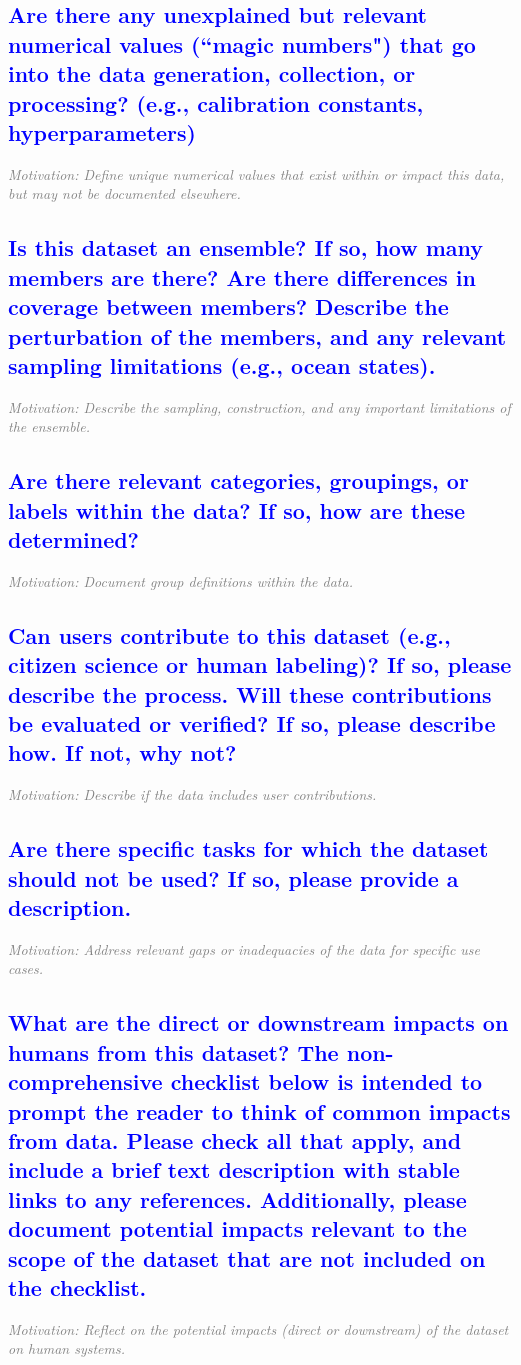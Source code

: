\documentclass[letterpaper, 10 pt, transmag]{IEEEtran}
\begin{document}
\textcolor{blue}{\subsection{Are there any unexplained but relevant numerical values (``magic numbers") that go into the data generation, collection, or processing? (e.g., calibration constants, hyperparameters)}}
\textcolor{gray}{\textit{Motivation: Define unique numerical values that exist within or impact this data, but may not be documented elsewhere.}}

\textcolor{blue}{\subsection{Is this dataset an ensemble? If so, how many members are there? Are there differences in coverage between members? Describe the perturbation of the members, and any relevant sampling limitations (e.g., ocean states).}}
\textcolor{gray}{\textit{Motivation: Describe the sampling, construction, and any important limitations of the ensemble.}}

\textcolor{blue}{\subsection{Are there relevant categories, groupings, or labels within the data? If so, how are these determined?}}
\textcolor{gray}{\textit{Motivation: Document group definitions within the data.}}

\textcolor{blue}{\subsection{Can users contribute to this dataset (e.g., citizen science or human labeling)? If so, please describe the process. Will these contributions be evaluated or verified? If so, please describe how. If not, why not?}}
\textcolor{gray}{\textit{Motivation: Describe if the data includes user contributions.}}

\textcolor{blue}{\subsection{Are there specific tasks for which the dataset should not be used? If so,
please provide a description.}}
\textcolor{gray}{\textit{Motivation: Address relevant gaps or inadequacies of the data for specific use cases.}}

\textcolor{blue}{\subsection{What are the direct or downstream impacts on humans from this dataset? The non-comprehensive checklist below is intended to prompt the reader to think of common impacts from data. Please check all that apply, and include a brief text description with stable links to any references. Additionally, please document potential impacts relevant to the scope of the dataset that are not included on the checklist.}}
\textcolor{gray}{\textit{Motivation: Reflect on the potential impacts (direct or downstream) of the dataset on human systems.}}
\end{document}
